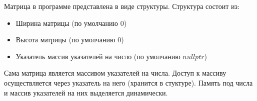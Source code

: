 Матрица в программе представлена в виде структуры.
Структура состоит из:

\begin{itemize}
	\item Ширина матрицы (по умолчанию 0)
	\item Высота матрицы (по умолчанию 0)
	\item Указатель массив указателей на число (по умолчанию $ nullptr $)
\end{itemize}

Сама матрица является массивом указателей на числа. 
Доступ к массиву осуществляется через указатель на него (хранится в стуктуре). 
Память под числа и массив указателей на них выделяется динамически. 
